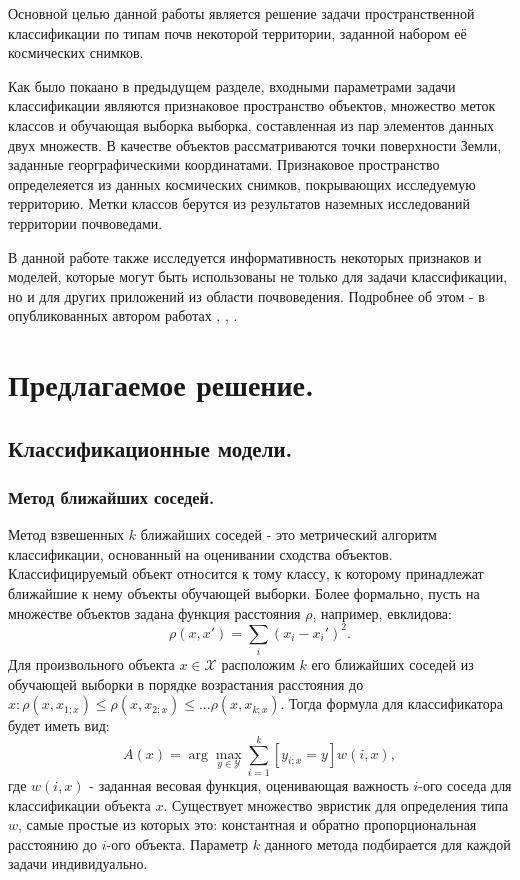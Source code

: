 \documentclass[14pt]{extarticle}
\begin{document}
\par
Основной целью данной работы является решение задачи пространственной классификации
по типам почв некоторой территории, заданной набором её космических снимков.
\par
Как было покаано в предыдущем разделе, входными параметрами задачи классификации являются
признаковое пространство объектов, множество меток классов и обучающая выборка выборка,
составленная из пар элементов данных двух множеств. В качестве объектов рассматриваются точки
поверхности Земли, заданные георграфическими координатами. Признаковое пространство определеяется
из данных космических снимков, покрывающих исследуемую территорию. Метки классов берутся
из результатов наземных исследований территории почвоведами.
\par
В данной работе также исследуется информативность некоторых признаков и моделей, 
которые могут быть использованы не только для задачи классификации, 
но и для других приложений из области почвоведения. 
Подробнее об этом - в опубликованных автором работах \cite{rukhovich-1}, \cite{rukhovich-2},
\cite{rukhovich-3}.

\section{Предлагаемое решение.}


\subsection{Классификационные модели.}


\subsubsection{Метод ближайших соседей.}

\par
Метод взвешенных $k$ ближайших соседей - это метрический алгоритм классификации,
основанный на оценивании сходства объектов. Классифицируемый объект относится к тому классу,
к которому принадлежат ближайшие к нему объекты обучающей выборки. Более формально,
пусть на множестве объектов задана функция расстояния $\rho$, например, евклидова:
\[
    \rho(x, x') = \sum_i (x_i - x_i')^2.
\]
Для произвольного объекта $x \in \mathcal{X}$ расположим $k$ его ближайших соседей
из обучающей выборки в порядке возрастания расстояния до 
$x: \rho(x, x_{1;x}) \le \rho(x, x_{2;x}) \le ... \rho(x, x_{k;x})$.
Тогда формула для классификатора будет иметь вид:
\[
    A(x)=\arg\max_{y\in\mathcal{Y}} \sum_{i=1}^k[y_{i;x}=y]w(i, x),
\]
где $w(i, x)$ - заданная весовая функция, оценивающая важность $i$-ого соседа для
классификации объекта $x$. Существует множество эвристик для определения типа $w$,
самые простые из которых это: константная и обратно пропорциональная расстоянию до $i$-ого
объекта. Параметр $k$ данного метода подбирается для каждой задачи индивидуально.
\end{document}
